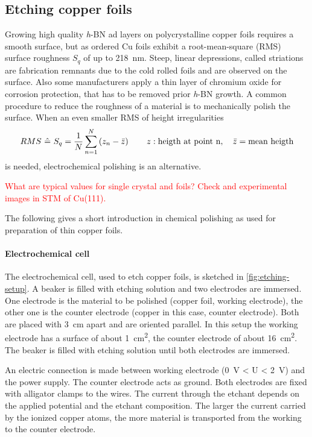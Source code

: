 \subsection{Etching copper foils}
Growing high quality \textit{h}-BN ad layers on polycrystalline copper foils requires a smooth surface, but as ordered Cu foils exhibit a root-mean-square (RMS) surface roughness $S_q$ of up to \SI{218}{\nm}\cite{bin_zhang_low-temperature_2012}. Steep, linear depressions, called striations are fabrication remnants due to the cold rolled foils and are observed on the surface\cite{kim_synthesis_2012-1}. Also some manufacturers apply a thin layer of chromium oxide for corrosion protection\cite{bin_zhang_low-temperature_2012}, that has to be removed prior \textit{h}-BN growth. A common procedure to reduce the roughness of a material is to mechanically polish the surface. When an even smaller RMS of height irregularities  
$$RMS\ \hat{=}\ S_q = \frac{1}{N}\sum_{n=1}^N\left(z_n-\bar{z}\right) \qquad z: \textnormal{heigth at point n}, \quad \bar{z} = \textnormal{mean heigth}$$ 
is needed, electrochemical polishing is an alternative.

\textcolor{red}{What are typical values for single crystal and foils? Check \cite{jinshan_electrochemical_2004} and experimental images in STM of Cu(111).}

The following gives a short introduction in chemical polishing as used for preparation of thin copper foils.\cite{antoine_polishing_1999, lilje_improved_2004, schulz_engeneering_2018}


\label{sec:etching}
\paragraph{Electrochemical cell}
The electrochemical cell, used to etch copper foils, is sketched in \autoref{fig:etching-setup}. A beaker is filled with etching solution and two electrodes are immersed. One electrode is the material to be polished (copper foil, working electrode), the other one is the counter electrode (copper in this case, counter electrode). Both are placed with \SI{3}{\centi \meter} apart and are oriented parallel. In this setup the working electrode has a surface of about \SI{1}{\square \centi \meter}, the counter electrode of about \SI{16}{\square \centi \meter}. The beaker is filled with etching solution until both electrodes are immersed.

An electric connection is made between working electrode (\SI{0}{\volt} < U < \SI{2}{\volt}) and the power supply. The counter electrode acts as ground. Both electrodes are fixed with alligator clamps to the wires. The current through the etchant depends on the applied potential and the etchant composition. The larger the current carried by the ionized copper atoms, the more material is transported from the working to the counter electrode.


